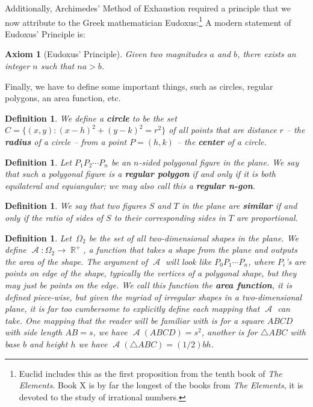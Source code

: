 \documentclass[letterpaper, 12pt]{amsart}
\DeclareMathOperator{\R}{\mathbb{R}}
\DeclareMathOperator{\A}{\mathcal{A}}
\newtheorem{axe}[thm]{Axiom}
\newtheorem{defn}[thm]{Definition}
\theoremstyle{definition}  %
\begin{document}
		Additionally, Archimedes' Method of Exhaustion required a principle that we now attribute to the Greek mathematician Eudoxus:\footnote{Euclid includes this as the first proposition from the tenth book of \textit{The Elements}. Book X is by far the longest of the books from \textit{The Elements}, it is devoted to the study of irrational numbers.}
		A modern statement of Eudoxus' Principle is:
		\begin{axe}[Eudoxus' Principle]
		\label{axe:eudoxus}
		Given two magnitudes $a$ and $b$, there exists an integer $n$ such that $na>b$.
		\end{axe}

		Finally, we have to define some important things, such as circles, regular polygons, an area function, etc.
		\begin{defn}
		\label{defn:circle}
		We define a \textbf{circle} to be the set $C = \{ (x,y) : (x - h)^{2} + (y - k)^{2} = r^{2} \}$ of all points that are distance $r$ -- the \textbf{radius} of a circle -- from a point $P = (h,k)$ -- the \textbf{center} of a circle.
		\end{defn}

		\begin{defn}
		\label{defn:reg_polygon}
		Let $P_{1}P_{2} \cdots P_{n}$ be an $n$-sided polygonal figure in the plane.
		We say that such a polygonal figure is a \textbf{regular polygon} if and only if it is both equilateral and equiangular; we may also call this a \textbf{regular n-gon}.
		\end{defn}

		\begin{defn}
		\label{defn:sim_polygons}
		We say that two figures $S$ and $T$ in the plane are \textbf{similar} if and only if the ratio of sides of $S$ to their corresponding sides in $T$ are proportional.
		\end{defn}

		\begin{defn}
		\label{defn:area_function}
		Let $\, \Omega_{2}$ be the set of all two-dimensional shapes in the plane.
		We define $\A : \Omega_{2} \to \R^{+}$, a function that takes a shape from the plane and outputs the area of the shape.
		The argument of $\A$ will look like $P_{0}P_{1} \cdots P_{n}$, where $P_{i}$'s are points on edge of the shape, typically the vertices of a polygonal shape, but they may just be points on the edge.
		We call this function the \textbf{area function}, it is defined piece-wise, but given the myriad of irregular shapes in a two-dimensional plane, it is far too cumbersome to explicitly define each mapping that $\A$ can take.
		One mapping that the reader will be familiar with is for a square $ABCD$ with side length $AB = s$, we have $\A(ABCD) = s^{2}$, another is for $\triangle ABC$ with base $b$ and height $h$ we have $\A(\triangle ABC) = (1/2)bh$.
		\end{defn}
\end{document}
